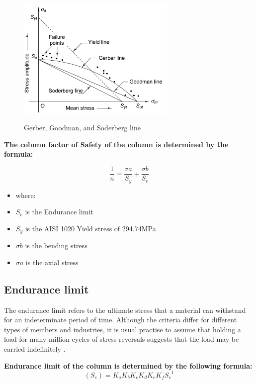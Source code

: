 {\begin{figure}[htp]
    \centering
    \includegraphics[width=3in]{Figures/soderberg&goodman_criteria.png}
    \caption{Gerber, Goodman, and Soderberg line}
    \cite{osakue2012linearized}
    \label{fig:3.11}
\end{figure}

\textbf{The column factor of Safety of the column is determined by the formula:}

\begin{equation}
 \frac {{1}}{{n}} = \frac{{\sigma a}}{{S_y}} + \frac{\sigma b}{S_e}
\end{equation}
 
 \begin{itemize}[label={}]
     \item where:
     \item \(S_e\) is the Endurance limit 
     \item \(S_y\) is the AISI 1020 Yield stress of 294.74MPa
     \item \(\sigma b\) is the bending stress
     \item \(\sigma a\) is the axial stress 
 \end{itemize}
 
 
\subsection{Endurance limit}
The endurance limit refers to the ultimate stress that a material can withstand for an indeterminate period of time. Although the criteria differ for different types of members and industries, it is usual practise to assume that holding a load for many million cycles of stress reversals suggests that the load may be carried indefinitely \cite{blodgett1964welded}.

\textbf{Endurance limit of the column is determined by the following formula:}
\begin{equation}
 (S_e) = K_a K_b K_c K_d K_e K_f {S_ e}^1
\end{equation}


}
